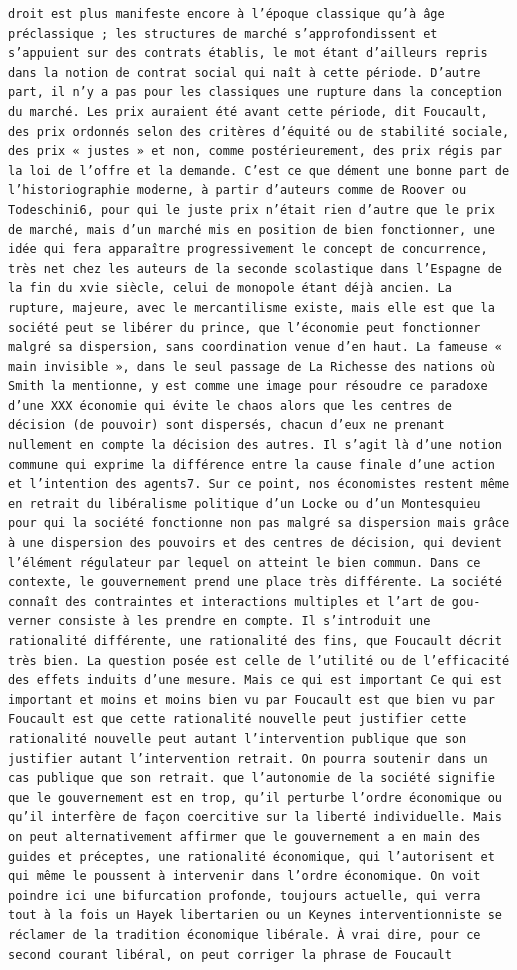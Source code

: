 \documentclass[
  letterpaper,
  DIV=11,
  numbers=noendperiod]{scrreprt}
\begin{document}
\begin{verbatim}
droit est plus manifeste encore à l’époque classique qu’à âge préclassique ; les structures de marché s’approfondissent et s’appuient sur des contrats établis, le mot étant d’ailleurs repris dans la notion de contrat social qui naît à cette période. D’autre part, il n’y a pas pour les classiques une rupture dans la conception du marché. Les prix auraient été avant cette période, dit Foucault, des prix ordonnés selon des critères d’équité ou de stabilité sociale, des prix « justes » et non, comme postérieurement, des prix régis par la loi de l’offre et la demande. C’est ce que dément une bonne part de l’historiographie moderne, à partir d’auteurs comme de Roover ou Todeschini6, pour qui le juste prix n’était rien d’autre que le prix de marché, mais d’un marché mis en position de bien fonctionner, une idée qui fera apparaître progressivement le concept de concurrence, très net chez les auteurs de la seconde scolastique dans l’Espagne de la fin du xvie siècle, celui de monopole étant déjà ancien. La rupture, majeure, avec le mercantilisme existe, mais elle est que la société peut se libérer du prince, que l’économie peut fonctionner malgré sa dispersion, sans coordination venue d’en haut. La fameuse « main invisible », dans le seul passage de La Richesse des nations où Smith la mentionne, y est comme une image pour résoudre ce paradoxe d’une XXX économie qui évite le chaos alors que les centres de décision (de pouvoir) sont dispersés, chacun d’eux ne prenant nullement en compte la décision des autres. Il s’agit là d’une notion commune qui exprime la différence entre la cause finale d’une action et l’intention des agents7. Sur ce point, nos économistes restent même en retrait du libéralisme politique d’un Locke ou d’un Montesquieu pour qui la société fonctionne non pas malgré sa dispersion mais grâce à une dispersion des pouvoirs et des centres de décision, qui devient l’élément régulateur par lequel on atteint le bien commun. Dans ce contexte, le gouvernement prend une place très différente. La société connaît des contraintes et interactions multiples et l’art de gou‑ verner consiste à les prendre en compte. Il s’introduit une rationalité différente, une rationalité des fins, que Foucault décrit très bien. La question posée est celle de l’utilité ou de l’efficacité des effets induits d’une mesure. Mais ce qui est important Ce qui est important et moins et moins bien vu par Foucault est que bien vu par Foucault est que cette rationalité nouvelle peut justifier cette rationalité nouvelle peut autant l’intervention publique que son justifier autant l’intervention retrait. On pourra soutenir dans un cas publique que son retrait. que l’autonomie de la société signifie que le gouvernement est en trop, qu’il perturbe l’ordre économique ou qu’il interfère de façon coercitive sur la liberté individuelle. Mais on peut alternativement affirmer que le gouvernement a en main des guides et préceptes, une rationalité économique, qui l’autorisent et qui même le poussent à intervenir dans l’ordre économique. On voit poindre ici une bifurcation profonde, toujours actuelle, qui verra tout à la fois un Hayek libertarien ou un Keynes interventionniste se réclamer de la tradition économique libérale. À vrai dire, pour ce second courant libéral, on peut corriger la phrase de Foucault 
\end{verbatim}
\end{document}
